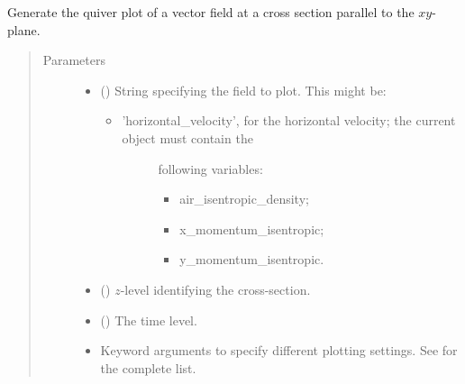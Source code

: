 \documentclass[letterpaper,10pt,english]{sphinxmanual}
\begin{document}
\begin{fulllineitems}
\begin{fulllineitems}
\end{fulllineitems}


\begin{fulllineitems}
\label{\detokenize{api:storages.state_isentropic.StateIsentropic.quiver_xy}}
Generate the quiver plot of a vector field at a cross section parallel to the \(xy\)-plane.
\begin{quote}\begin{description}
\item[{Parameters}] \leavevmode\begin{itemize}
\item {} 
 () \textendash{} 
String specifying the field to plot. This might be:
\begin{itemize}
\item {} \begin{description}
\item[{’horizontal\_velocity’, for the horizontal velocity; the current object must contain the}] \leavevmode
following variables:
\begin{itemize}
\item {} 
air\_isentropic\_density;

\item {} 
x\_momentum\_isentropic;

\item {} 
y\_momentum\_isentropic.

\end{itemize}

\end{description}

\end{itemize}


\item {} 
 () \textendash{} \(z\)-level identifying the cross-section.

\item {} 
 () \textendash{} The time level.

\item {} 
 \textendash{} Keyword arguments to specify different plotting settings.
See {\hyperref[\detokenize{api:tasmania.utils.utils_plot.quiver_xy}]{}} for the complete list.


\end{itemize}
\end{description}
\end{quote}
\end{fulllineitems}
\end{fulllineitems}
\end{document}
